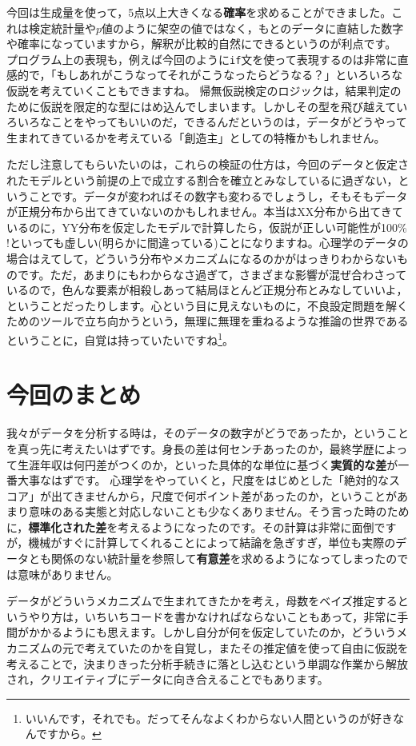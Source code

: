 \documentclass{ltjsbook}
\begin{document}
今回は生成量を使って，5点以上大きくなる\textbf{確率}を求めることができました。これは検定統計量や$p$値のように架空の値ではなく，もとのデータに直結した数字や確率になっていますから，解釈が比較的自然にできるというのが利点です。
プログラム上の表現も，例えば今回のように\texttt{if}文を使って表現するのは非常に直感的で，「もしあれがこうなってそれがこうなったらどうなる？」といろいろな仮説を考えていくこともできますね。
帰無仮説検定のロジックは，結果判定のために仮説を限定的な型にはめ込んでしまいます。しかしその型を飛び越えていろいろなことをやってもいいのだ，できるんだというのは，データがどうやって生まれてきているかを考えている「創造主」としての特権かもしれません。

ただし注意してもらいたいのは，これらの検証の仕方は，今回のデータと仮定されたモデルという前提の上で成立する割合を確立とみなしているに過ぎない，ということです。データが変わればその数字も変わるでしょうし，そもそもデータが正規分布から出てきていないのかもしれません。本当はXX分布から出てきているのに，YY分布を仮定したモデルで計算したら，仮説が正しい可能性が100\% !といっても虚しい(明らかに間違っている)ことになりますね。心理学のデータの場合はえてして，どういう分布やメカニズムになるのかがはっきりわからないものです。ただ，あまりにもわからなさ過ぎて，さまざまな影響が混ぜ合わさっているので，色んな要素が相殺しあって結局ほとんど正規分布とみなしていいよ，ということだったりします。心という目に見えないものに，不良設定問題を解くためのツールで立ち向かうという，無理に無理を重ねるような推論の世界であるということに，自覚は持っていたいですね\footnote{いいんです，それでも。だってそんなよくわからない人間というのが好きなんですから。}。


\section{今回のまとめ}
我々がデータを分析する時は，そのデータの数字がどうであったか，ということを真っ先に考えたいはずです。身長の差は何センチあったのか，最終学歴によって生涯年収は何円差がつくのか，といった具体的な単位に基づく\textbf{実質的な差}が一番大事なはずです。
心理学をやっていくと，尺度をはじめとした「絶対的なスコア」が出てきませんから，尺度で何ポイント差があったのか，ということがあまり意味のある実態と対応しないことも少なくありません。そう言った時のために，\textbf{標準化された差}を考えるようになったのです。その計算は非常に面倒ですが，機械がすぐに計算してくれることによって結論を急ぎすぎ，単位も実際のデータとも関係のない統計量を参照して\textbf{有意差}を求めるようになってしまったのでは意味がありません。

データがどういうメカニズムで生まれてきたかを考え，母数をベイズ推定するというやり方は，いちいちコードを書かなければならないこともあって，非常に手間がかかるようにも思えます。しかし自分が何を仮定していたのか，どういうメカニズムの元で考えていたのかを自覚し，またその推定値を使って自由に仮説を考えることで，決まりきった分析手続きに落とし込むという単調な作業から解放され，クリエイティブにデータに向き合えることでもあります。
\end{document}
